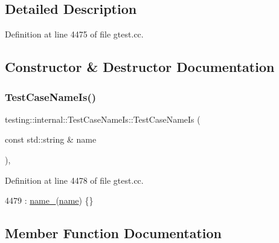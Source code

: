 \subsection{Detailed Description}


Definition at line 4475 of file gtest.\+cc.



\subsection{Constructor \& Destructor Documentation}
\mbox{\label{classtesting_1_1internal_1_1TestCaseNameIs_a7c983707f4cfe7f36dbabc95da5113c4}} 
\subsubsection{\texorpdfstring{Test\+Case\+Name\+Is()}{TestCaseNameIs()}}
{\footnotesize\ttfamily testing\+::internal\+::\+Test\+Case\+Name\+Is\+::\+Test\+Case\+Name\+Is (\begin{DoxyParamCaption}\item[{const std\+::string \&}]{name }\end{DoxyParamCaption})\hspace{0.3cm}{\ttfamily [inline]}, {\ttfamily [explicit]}}



Definition at line 4478 of file gtest.\+cc.


\begin{DoxyCode}
4479       : \hyperlink{classtesting_1_1internal_1_1TestCaseNameIs_a4e780c6613a81c4f14fc57e00c61474b}{name\_}(\hyperlink{namespaceinteractive__marker_a447655961b3d3ca3c5a2a9d3d769436d}{name}) \{\}
\end{DoxyCode}


\subsection{Member Function Documentation}
\mbox{\label{classtesting_1_1internal_1_1TestCaseNameIs_aa96c4e9facbaa7043c8f0b34465d1eae}} 
